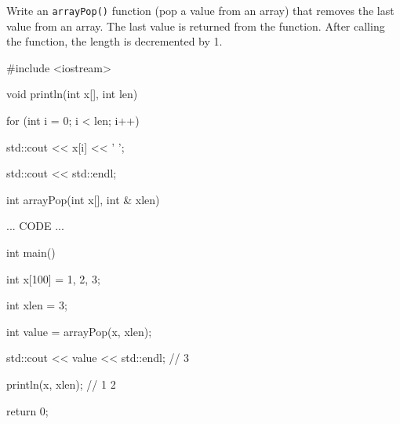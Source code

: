 Write an \texttt{arrayPop()} function (pop a value from an array) that removes the last value from an array. The last value is returned from the function. After calling the function, the length is decremented by 1.



\begin{consolethree}[escapeinside=||]

#include <iostream>



void println(int x[], int len)

{

    for (int i = 0; i < len; i++)

    {

        std::cout << x[i] << ' ';

    }

    std::cout << std::endl;

}



int arrayPop(int x[], int & xlen)

{

    ... CODE ...

}



int main()

{

    int x[100] = {1, 2, 3};

    int xlen = 3;

    int value = arrayPop(x, xlen);

    std::cout << value << std::endl; // 3

    println(x, xlen); // 1 2

    return 0;

}

\end{consolethree}

